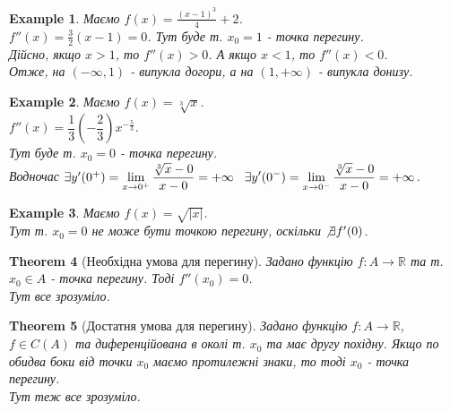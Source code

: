 \documentclass[a4paper, 14pt]{article}
\theoremstyle{theoremdd}
\newtheorem{theorem}{Theorem}[subsection]
\theoremstyle{theoremdd}
\theoremstyle{theoremdd}
\theoremstyle{theoremdd}
\newtheorem{example}[theorem]{Example}
\theoremstyle{theoremdd}
\theoremstyle{theoremdd}
\theoremstyle{theoremdd}
\theoremstyle{theoremdd}
\begin{document}
\begin{example}
Маємо $f(x) = \displaystyle \frac{(x-1)^3}{4} + 2$.\\
$f''(x) = \displaystyle \frac{3}{2}(x-1) = 0$. Тут буде т. $x_0 = 1$ - точка перегину.\\
Дійсно, якщо $x > 1$, то $f''(x) > 0$. А якщо $x < 1$, то $f''(x) < 0$.\\
Отже, на $(-\infty,1)$ - випукла догори, а на $(1,+\infty)$ - випукла донизу.
\end{example}

\begin{example}
Маємо $f(x) = \sqrt[3]{x}$.\\
$f''(x) = \dfrac{1}{3} \left( -\dfrac{2}{3} \right) x^{-\frac{5}{3}}$.\\
Тут буде т. $x_0 = 0$ - точка перегину.\\
Водночас $\exists y'(0^+) = \displaystyle \lim_{x \to 0^+} \dfrac{\sqrt[3]{x} - 0}{x - 0} = +\infty \hspace{0.3cm} \exists y'(0^-) = \displaystyle \lim_{x \to 0^-} \dfrac{\sqrt[3]{x} - 0}{x - 0} = +\infty$.
\begin{figure}[H]
\centering
{}
\end{figure}
\end{example}

\begin{example}
Маємо $f(x) = \sqrt{|x|}$.\\
Тут т. $x_0 = 0$ не може бути точкою перегину, оскільки $\not \exists f'(0)$.
\end{example}

\begin{theorem}[Необхідна умова для перегину]
Задано функцію $f: A \to \mathbb{R}$ та т. $x_0 \in A$ - точка перегину. Тоді $f''(x_0) = 0$.\\
\textit{Тут все зрозуміло.}
\end{theorem}

\begin{theorem}[Достатня умова для перегину]
Задано функцію $f: A \to \mathbb{R}$, $f \in C(A)$ та диференційована в околі т. $x_0$ та має другу похідну. Якщо по обидва боки від точки $x_0$ маємо протилежні знаки, то тоді $x_0$ - точка перегину.\\
\textit{Тут теж все зрозуміло.}
\end{theorem}
\end{document}
